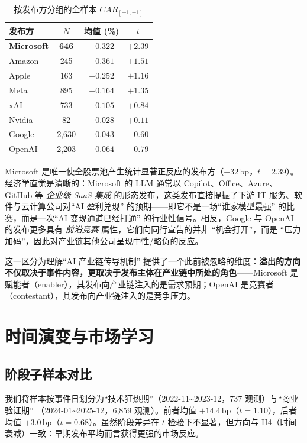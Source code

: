 \documentclass[11pt]{ctexart}
\begin{document}
\begin{table}[htbp]
\centering
\caption{按发布方分组的全样本 $\overline{CAR}_{[-1,+1]}$}
\label{tab:by_publisher}
\small
\begin{tabular}{lccc}
\toprule
发布方 & $N$ & 均值 (\%) & $t$ \\
\midrule
\textbf{Microsoft} & \textbf{646} & $\mathbf{+0.322}$ & $\mathbf{+2.39}$ \\
Amazon     & 245  & $+0.361$ & $+1.51$ \\
Apple      & 163  & $+0.252$ & $+1.16$ \\
Meta       & 895  & $+0.164$ & $+1.35$ \\
xAI        & 733  & $+0.105$ & $+0.84$ \\
Nvidia     & 82   & $+0.028$ & $+0.11$ \\
Google     & 2{,}630 & $-0.043$ & $-0.60$ \\
OpenAI     & 2{,}203 & $-0.064$ & $-0.79$ \\
\bottomrule
\end{tabular}
\end{table}

Microsoft 是唯一使全股票池产生统计显著正反应的发布方（$+32\,\text{bp}$，$t=2.39$）。经济学直觉是清晰的：Microsoft 的 LLM 通常以 Copilot、Office、Azure、GitHub 等 \emph{企业级 SaaS 集成} 的形态发布，这类发布直接提振了下游 IT 服务、软件与云计算公司对“AI 盈利兑现” 的预期——即它不是一场“谁家模型最强” 的比赛，而是一次“AI 变现通道已经打通” 的行业性信号。相反，Google 与 OpenAI 的发布更多具有 \emph{前沿竞赛} 属性，它们向同行宣告的并非 “机会打开”，而是 “压力加码”，因此对产业链其他公司呈现中性/略负的反应。

这一区分为理解“AI 产业链传导机制” 提供了一个此前被忽略的维度：\textbf{溢出的方向不仅取决于事件内容，更取决于发布主体在产业链中所处的角色}——Microsoft 是赋能者（enabler），其发布向产业链注入的是需求预期；OpenAI 是竞赛者（contestant），其发布向产业链注入的是竞争压力。

\section{时间演变与市场学习}
\label{sec:time}

\subsection{阶段子样本对比}

我们将样本按事件日划分为“技术狂热期”（2022-11\textasciitilde 2023-12，737 观测）与“商业验证期” （2024-01\textasciitilde 2025-12，6{,}859 观测）。前者均值 $+14.4\,\text{bp}$（$t=1.10$），后者均值 $+3.0\,\text{bp}$（$t=0.68$）。虽然阶段差异在 $t$ 检验下不显著，但方向与 H4（时间衰减）一致：早期发布平均而言获得更强的市场反应。
\end{document}
